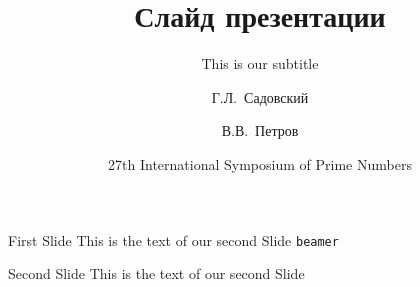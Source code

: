 \documentclass[10pt]{beamer}
\begin{document}
\title{Слайд презентации}
\subtitle{This is our subtitle}
\author[Садовский, Петров]
{Г.Л.~Садовский \and В.В.~Петров}

\date[ISPN ’80]{27th International Symposium of Prime Numbers}


    
\begin{frame}{}
\titlepage
\end{frame}

\begin{frame}[c]{First Slide}
    This is the text of our second Slide \texttt{beamer}
\end{frame}

\begin{frame}{Second Slide}
    This is the text of our second Slide
\end{frame}
\end{document}
